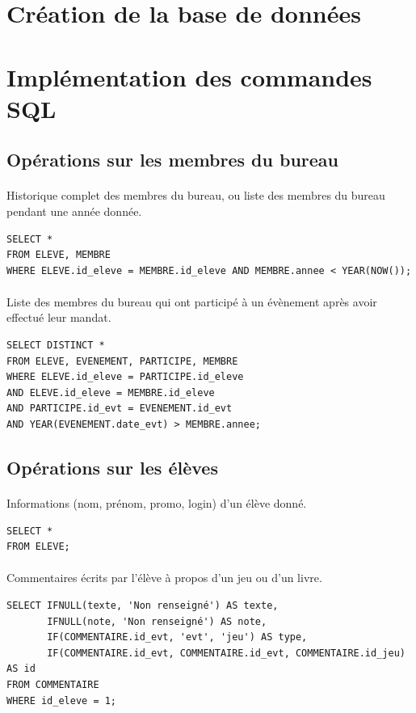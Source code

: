 \documentclass[a4paper, 11pt]{article}
\begin{document}
\section{Création de la base de données}
\section{Implémentation des commandes SQL}
\subsection{Opérations sur les membres du bureau}
\paragraph{}
Historique complet des membres du bureau, ou liste des membres du bureau pendant une année donnée.
\begin{verbatim}
SELECT *
FROM ELEVE, MEMBRE
WHERE ELEVE.id_eleve = MEMBRE.id_eleve AND MEMBRE.annee < YEAR(NOW());
\end{verbatim}
\paragraph{}
Liste des membres du bureau qui ont participé à un évènement après avoir effectué leur mandat.
\begin{verbatim}
SELECT DISTINCT *
FROM ELEVE, EVENEMENT, PARTICIPE, MEMBRE
WHERE ELEVE.id_eleve = PARTICIPE.id_eleve
AND ELEVE.id_eleve = MEMBRE.id_eleve
AND PARTICIPE.id_evt = EVENEMENT.id_evt
AND YEAR(EVENEMENT.date_evt) > MEMBRE.annee;
\end{verbatim}
\subsection{Opérations sur les élèves}
\paragraph{}
Informations (nom, prénom, promo, login) d'un élève donné.
\begin{verbatim}
SELECT *
FROM ELEVE;
\end{verbatim}
\paragraph{}
Commentaires écrits par l'élève à propos d'un jeu ou d'un livre.
\begin{verbatim}
SELECT IFNULL(texte, 'Non renseigné') AS texte,
       IFNULL(note, 'Non renseigné') AS note,
       IF(COMMENTAIRE.id_evt, 'evt', 'jeu') AS type, 
       IF(COMMENTAIRE.id_evt, COMMENTAIRE.id_evt, COMMENTAIRE.id_jeu) AS id
FROM COMMENTAIRE
WHERE id_eleve = 1;
\end{verbatim}
\end{document}
